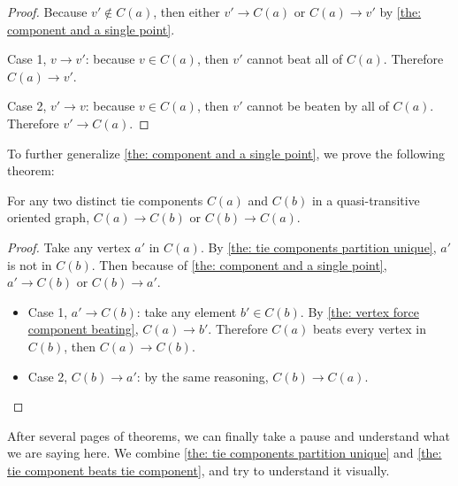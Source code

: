 \begin{proof}
  Because \(v' \notin C(a)\),
  then either \(v' \to C(a)\) or \(C(a) \to v'\)
  by \cref{the: component and a single point}.

  Case 1, \(v \to v'\): because \(v \in C(a)\),
  then \(v'\) cannot beat all of \(C(a)\).
  Therefore \(C(a) \to v'\).

  Case 2, \(v' \to v\): because \(v \in C(a)\),
  then \(v'\) cannot be beaten by all of \(C(a)\).
  Therefore \(v' \to C(a)\).
\end{proof}

To further generalize \cref{the: component and a single point},
we prove the following theorem:

\begin{theorem}\label{the: tie component beats tie component}
  For any two distinct tie components \(C(a)\) and \(C(b)\)
  in a quasi-transitive oriented graph,
  \(C(a) \to C(b)\) or \(C(b) \to C(a)\).
\end{theorem}

\begin{proof}
  Take any vertex \(a'\) in \(C(a)\).
  By \cref{the: tie components partition unique}, \(a'\) is not in \(C(b)\).
  Then because of \cref{the: component and a single point},
  \(a' \to C(b)\) or \(C(b) \to a'\).

  \begin{itemize}
    \item
      Case 1, \(a' \to C(b)\): take any element \(b' \in C(b)\).
      By \cref{the: vertex force component beating}, \(C(a) \to b'\).
      Therefore \(C(a)\) beats every vertex in \(C(b)\),
      then \(C(a) \to C(b)\).
    \item
      Case 2, \(C(b) \to a'\):
      by the same reasoning, \(C(b) \to C(a)\).
  \end{itemize}
\end{proof}

After several pages of theorems,
we can finally take a pause
and understand what we are saying here.
We combine \cref{the: tie components partition unique} and
\cref{the: tie component beats tie component},
and try to understand it visually.

